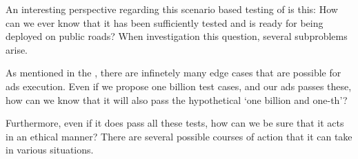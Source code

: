 An interesting perspective regarding this scenario based testing of
 is this: How can we ever know that it has been sufficiently
tested and is ready for being deployed on public roads? When investigation this
question, several subproblems arise.

As mentioned in the , there are infinetely many
edge cases that are possible for \acrshort{ads} execution. Even if we propose
one billion test cases, and our \acrshort{ads} passes these, how can we know
that it will also pass the hypothetical `one billion and one-th'?

Furthermore, even if it does pass all these tests, how can we be sure that it
acts in an ethical manner? There are several possible courses of action that it
can take in various situations.
